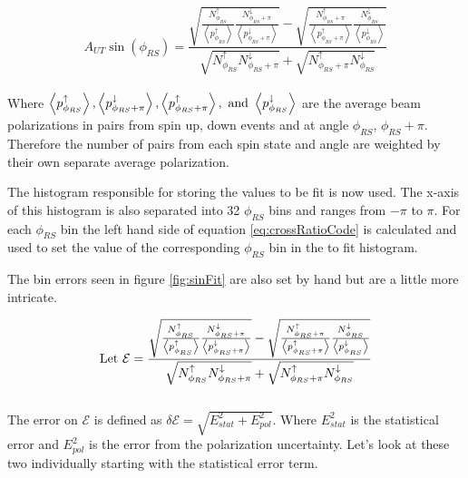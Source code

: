 \documentclass[abstract = on,listof=totoc, bibliography=totoc]{scrreprt}
\newcommand{\phirs}{\phi_{RS}}
\begin{document}
\begin{equation}
\label{eq:crossRatioCode}
A_{UT}\sin(\phi_{RS} ) = \frac{\sqrt{\frac{N^\uparrow_{\phi_{RS}}}{\left<p^\uparrow_{\phirs}\right>} \frac{N^\downarrow_{\phi_{RS}+\pi}}{\left<p^\downarrow_{\phirs+\pi}\right>}} - \sqrt{\frac{N^\uparrow_{\phi_{RS}+\pi}}{\left<p^\uparrow_{\phirs+\pi}\right>} \frac{N^\downarrow_{\phi_{RS}}}{\left<p^\downarrow_{\phirs}\right>}}}       {\sqrt{N^\uparrow_{\phi_{RS}} N^\downarrow_{\phi_{RS}+\pi}} + \sqrt{N^\uparrow_{\phi_{RS}+\pi} N^\downarrow_{\phi_{RS}}}}
\end{equation}\\
%
Where $\left<p^\uparrow_{\phirs}\right>, \left<p^\downarrow_{\phirs+\pi}\right>, \left<p^\uparrow_{\phirs+\pi}\right>, \textnormal{ and } \left<p^\downarrow_{\phirs}\right>$ are the average beam polarizations in pairs from spin up, down events and at angle $\phirs$, $\phirs + \pi$. Therefore the number of pairs from each spin state and angle are weighted by their own separate average polarization.   

The histogram responsible for storing the values to be fit is now used. The x-axis of this histogram is also separated into 32 $\phirs$ bins and ranges from $-\pi$ to $\pi$. For each $\phirs$ bin the left hand side of equation \ref{eq:crossRatioCode} is calculated and used to set the value of the corresponding $\phirs$ bin in the to fit histogram.

The bin errors seen in figure \ref{fig:sinFit} are also set by hand but are a little more intricate. 

\begin{equation}
\label{eq:epsilon}
\textnormal{Let } \mathcal{E} = \frac{\sqrt{\frac{N^\uparrow_{\phi_{RS}}}{\left<p^\uparrow_{\phirs}\right>} \frac{N^\downarrow_{\phi_{RS}+\pi}}{\left<p^\downarrow_{\phirs+\pi}\right>}} - \sqrt{\frac{N^\uparrow_{\phi_{RS}+\pi}}{\left<p^\uparrow_{\phirs+\pi}\right>} \frac{N^\downarrow_{\phi_{RS}}}{\left<p^\downarrow_{\phirs}\right>}}}       {\sqrt{N^\uparrow_{\phi_{RS}} N^\downarrow_{\phi_{RS}+\pi}} + \sqrt{N^\uparrow_{\phi_{RS}+\pi} N^\downarrow_{\phi_{RS}}}}
\end{equation}\\

The error on $\mathcal{E}$ is defined as $\delta \mathcal{E} = \sqrt{E^2_{stat} + E^2_{pol}}$. Where $E^2_{stat}$ is the statistical error and $E^2_{pol}$ is the error from the polarization uncertainty. Let's look at these two individually starting with the statistical error term.
\end{document}
